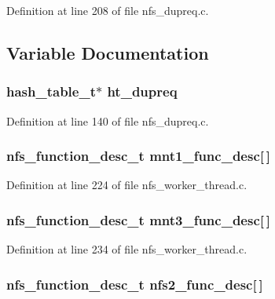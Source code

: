 Definition at line 208 of file nfs\_\-dupreq.c.

\subsection{Variable Documentation}
\subsubsection[{ht\_\-dupreq}]{\setlength{\rightskip}{0pt plus 5cm}hash\_\-table\_\-t$\ast$ {\bf ht\_\-dupreq}}\label{nfs__dupreq_8c_3ada0731d68a5b4aab865acfd3d73290}




Definition at line 140 of file nfs\_\-dupreq.c.
\subsubsection[{mnt1\_\-func\_\-desc}]{\setlength{\rightskip}{0pt plus 5cm}nfs\_\-function\_\-desc\_\-t {\bf mnt1\_\-func\_\-desc}[$\,$]}\label{nfs__dupreq_8c_331b43564c209696c670c70673d544e1}




Definition at line 224 of file nfs\_\-worker\_\-thread.c.
\subsubsection[{mnt3\_\-func\_\-desc}]{\setlength{\rightskip}{0pt plus 5cm}nfs\_\-function\_\-desc\_\-t {\bf mnt3\_\-func\_\-desc}[$\,$]}\label{nfs__dupreq_8c_7bcfef9b974d9b55a0f057d959a13bb8}




Definition at line 234 of file nfs\_\-worker\_\-thread.c.
\subsubsection[{nfs2\_\-func\_\-desc}]{\setlength{\rightskip}{0pt plus 5cm}nfs\_\-function\_\-desc\_\-t {\bf nfs2\_\-func\_\-desc}[$\,$]}\label{nfs__dupreq_8c_d1973964670037b91a33fd6b6e4c40bc}




